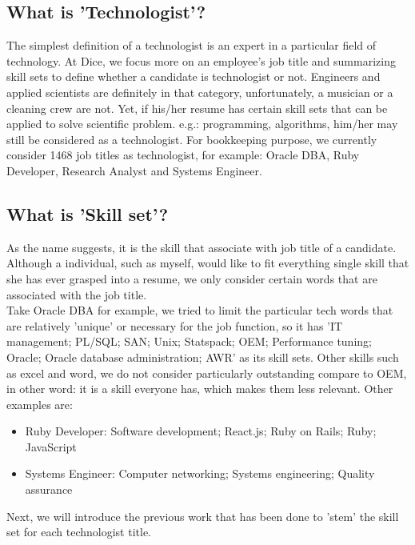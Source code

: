 \subsection{What is  'Technologist'?}
The simplest definition of a technologist is an expert in a particular field of technology. At Dice, we focus more on an employee's job title and summarizing skill sets to define  whether a candidate is  technologist or not. Engineers and applied scientists are definitely in that category, unfortunately, a musician or a cleaning crew are not. Yet, if his/her resume has certain skill sets that can be applied to solve scientific problem. e.g.: programming, algorithms, him/her  may still be considered as a technologist. For bookkeeping purpose, we currently consider 1468 job titles as technologist, for example: Oracle DBA, Ruby Developer, Research Analyst and Systems Engineer. 
\subsection{What is 'Skill set'?}
As the name suggests, it is the skill that associate with job title of a candidate. Although a individual, such as myself, would like to fit everything single skill that she has ever grasped into a resume, we only consider certain words that are associated with the job title.\\
Take Oracle DBA for example, we tried to limit the particular tech words that are relatively 'unique' or necessary for the job function, so it has 'IT management; PL/SQL; SAN; Unix; Statspack; OEM; Performance tuning; Oracle; Oracle database administration; AWR' as its skill sets. Other skills such as excel and word, we do not consider particularly outstanding compare to OEM, in other word: it is a skill everyone has, which makes them less relevant. Other examples are:
\begin{itemize}
	\item Ruby Developer: Software development; React.js; Ruby on Rails; Ruby; JavaScript
		\item Systems Engineer:	Computer networking; Systems engineering; Quality assurance
\end{itemize}
Next, we will introduce the previous work that has been done to 'stem' the skill set for each technologist title.
